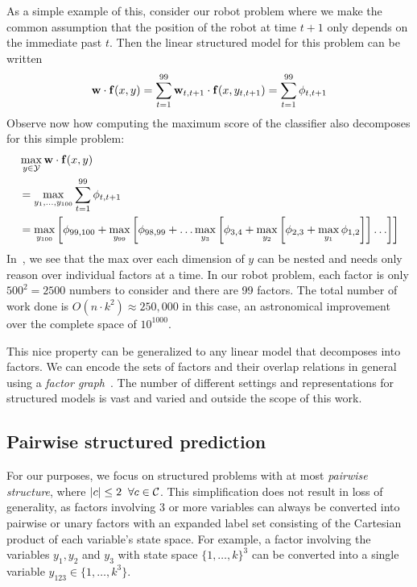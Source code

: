 As a simple example of this, consider our robot problem where we make the 
common assumption that the position of the robot at time $t+1$ only depends on 
the immediate past $t$.  Then the linear structured model for this problem can 
be written
\begin{equation*}
\mathbf{w} \cdot \mathbf{f}(x,y) = \sum_{t=1}^{99} \mathbf{w}_{t,t+1} \cdot \mathbf{f}(x,y_{t,t+1}) = \sum_{t=1}^{99} \phi_{t,t+1} 
\end{equation*}
Observe now how computing the maximum score of the classifier also decomposes for this simple problem:
\begin{align}
&\max_{y \in \mathcal{Y}} \mathbf{w} \cdot \mathbf{f}(x,y)\\ &= \max_{y_1,\ldots,y_{100}} \sum_{t=1}^{99} \phi_{t,t+1} \\
&= \max_{y_{100}} \left[ \phi_{99,100} + \max_{y_{99}} \left[ \phi_{98,99} + \ldots \max_{y_3} \left[\phi_{3,4} + \max_{y_2} \left[ \phi_{2,3} + \max_{y_1} \phi_{1,2} \right] \right] \ldots \right] \right] 
\label{eq:nesting} \end{align} 
In~, we see that the max over each dimension of $y$ can be
nested and needs only reason over individual factors at a time.  In our robot problem,
each factor is only $500^2 = 2500$ numbers to consider and there are 99 factors. The total number of work done is $O(n \cdot k^2) \approx 250,000$ in
this case, an astronomical improvement over the complete space of $10^{1000}$.

This nice property can be generalized to any linear model that decomposes into 
factors.  We can encode the sets of factors and their overlap relations in 
general using a {\em factor graph}~\citep{koller-book}.  The number of 
different settings and representations for structured models is vast and varied 
and outside the scope of this work. 

\subsection{Pairwise structured prediction}\label{sec:pairwise-model} For our purposes, we focus on structured problems with at most {\em pairwise structure}, where $|c| \leq 2\;\; \forall c \in \mathcal{C}$.  This simplification does not result in loss of generality, as factors involving 3 or more variables can always be converted into pairwise or unary factors with an expanded label set consisting of the Cartesian product of each variable's state space. For example, a factor involving the variables $y_1,y_2$ and $y_3$ with state space $\{1,\ldots,k\}^3$ can be converted into a single variable $y_{123} \in \{1,\ldots,k^3\}$.

